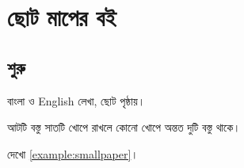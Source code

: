 \documentclass[a5paper,10pt,oneside,openany]{bookbangla}
\begin{document}
\mainmatter
\chapter{ছোট মাপের বই}
\section{শুরু}
বাংলা ও English লেখা, ছোট পৃষ্ঠায়।
\begin{example}\label{example:smallpaper}
আটটি বস্তু সাতটি খোপে রাখলে কোনো খোপে অন্তত দুটি বস্তু থাকে।
\end{example}
দেখো \autoref{example:smallpaper}।
\end{document}
